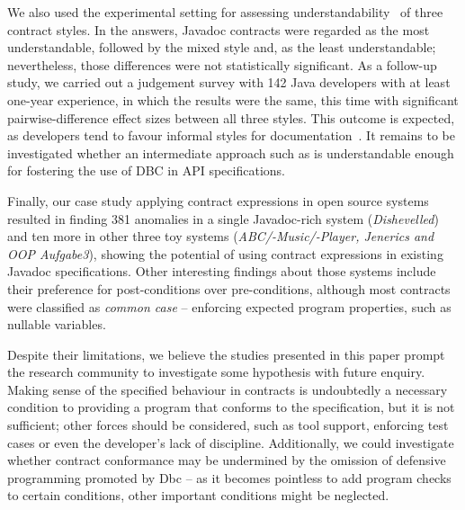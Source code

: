 We also used the experimental setting for assessing understandability~\cite{Scalabrino2017} of three contract styles. 
In the answers, Javadoc contracts were regarded as the most understandable, followed by the mixed \contractjdoc{} style and, as the least understandable; nevertheless, those differences were not statistically significant. As a follow-up study, we carried out a judgement survey with 142 Java developers with at least one-year experience, in which the results were the same, this time with significant pairwise-difference effect sizes between all three styles.
This outcome is expected, as developers tend to favour informal styles for documentation~\cite{Polikarpova-etal09}. It remains to be investigated whether an intermediate approach such as \contractjdoc{} is understandable enough for fostering the use of DBC in API specifications.

Finally, our case study applying contract expressions in open source systems resulted in finding 381 anomalies in a single Javadoc-rich system (\emph{Dishevelled}) and ten more in other three toy systems (\emph{ABC/-Music/-Player, Jenerics and OOP Aufgabe3}), showing the potential of using contract expressions in existing Javadoc specifications.
Other interesting findings about those systems include their preference for post-conditions over pre-conditions, although most contracts were classified as \emph{common case} -- enforcing expected program properties, such as nullable variables.

Despite their limitations, we believe the studies presented in this paper prompt the research community to investigate some hypothesis with future enquiry. 
Making sense of the specified behaviour in contracts is undoubtedly a necessary condition to providing a program that conforms to the specification, but it is not sufficient; other forces should be considered, such as tool support, enforcing test cases or even the developer's lack of discipline.  
Additionally, we could investigate whether contract conformance may be undermined by the omission of defensive programming promoted by Dbc -- as it becomes pointless to add program checks to certain conditions, other important conditions might be neglected. 


